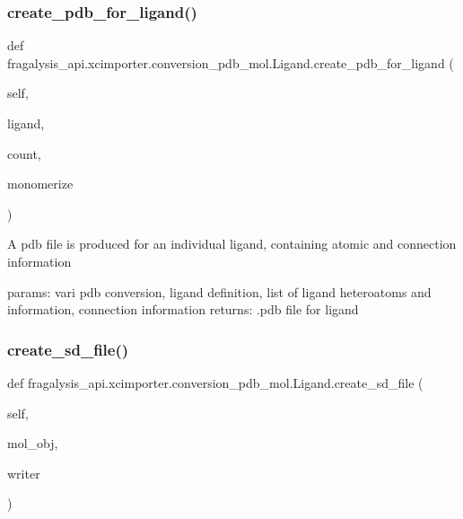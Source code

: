\subsubsection{\texorpdfstring{create\+\_\+pdb\+\_\+for\+\_\+ligand()}{create\_pdb\_for\_ligand()}}
{\footnotesize\ttfamily def fragalysis\+\_\+api.\+xcimporter.\+conversion\+\_\+pdb\+\_\+mol.\+Ligand.\+create\+\_\+pdb\+\_\+for\+\_\+ligand (\begin{DoxyParamCaption}\item[{}]{self,  }\item[{}]{ligand,  }\item[{}]{count,  }\item[{}]{monomerize }\end{DoxyParamCaption})}

\begin{DoxyVerb}A pdb file is produced for an individual ligand, containing atomic and connection information

params: vari pdb conversion, ligand definition, list of ligand heteroatoms and information, connection information
returns: .pdb file for ligand
\end{DoxyVerb}
 \mbox{\label{classfragalysis__api_1_1xcimporter_1_1conversion__pdb__mol_1_1_ligand_a9985de5dae739f11768aa6985ccd94bd}} 
\subsubsection{\texorpdfstring{create\+\_\+sd\+\_\+file()}{create\_sd\_file()}}
{\footnotesize\ttfamily def fragalysis\+\_\+api.\+xcimporter.\+conversion\+\_\+pdb\+\_\+mol.\+Ligand.\+create\+\_\+sd\+\_\+file (\begin{DoxyParamCaption}\item[{}]{self,  }\item[{}]{mol\+\_\+obj,  }\item[{}]{writer }\end{DoxyParamCaption})}


